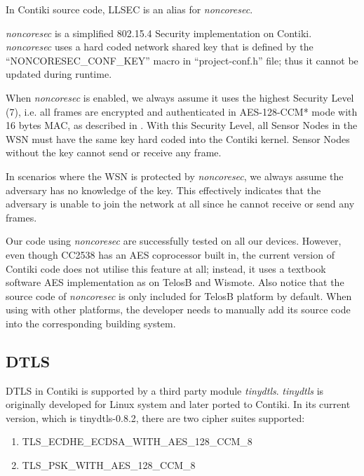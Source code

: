 In Contiki source code, LLSEC is an alias for \textit{noncoresec}.

\textit{noncoresec}\cite{noncoresec}\cite{LLSEC} is a simplified 802.15.4 Security implementation on Contiki. \textit{noncoresec} uses a hard coded network shared key that is defined by the ``NONCORESEC\_CONF\_KEY'' macro in ``project-conf.h'' file; thus it cannot be updated during runtime. 

When \textit{noncoresec} is enabled, we always assume it uses the highest Security Level (7), i.e. all frames are encrypted and authenticated in AES-128-CCM* mode with 16 bytes MAC, as described in . With this Security Level, all Sensor Nodes in the WSN must have the same key hard coded into the Contiki kernel. Sensor Nodes without the key cannot send or receive any frame.

In scenarios where the WSN is protected by \textit{noncoresec}, we always assume the adversary has no knowledge of the key. This effectively indicates that the adversary is unable to join the network at all since he cannot receive or send any frames.

Our code using \textit{noncoresec} are successfully tested on all our devices. However, even though CC2538 has an AES coprocessor built in, the current version of Contiki code does not utilise this feature at all; instead, it uses a textbook software AES implementation as on TelosB and Wismote. Also notice that the source code of \textit{noncoresec} is only included for TelosB platform by default. When using with other platforms, the developer needs to manually add its source code into the corresponding building system.

\subsection{DTLS}

DTLS in Contiki is supported by a third party module \textit{tinydtls}\cite{tinydtls}. \textit{tinydtls} is originally developed for Linux system and later ported to Contiki. In its current version, which is tinydtls-0.8.2, there are two cipher suites supported:

\begin{enumerate}
	\item TLS\_ECDHE\_ECDSA\_WITH\_AES\_128\_CCM\_8\cite{rfc7251}
	\item TLS\_PSK\_WITH\_AES\_128\_CCM\_8\cite{rfc6655}
\end{enumerate}

